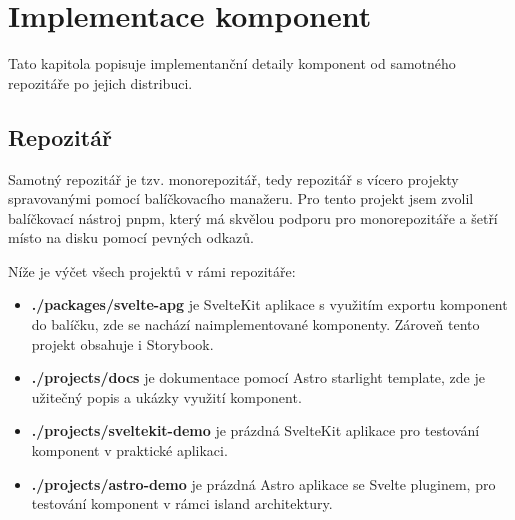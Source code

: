 \chapter{Implementace komponent}

Tato kapitola popisuje implementanční detaily komponent od samotného repozitáře po jejich distribuci.

\section{Repozitář}

Samotný repozitář je tzv. monorepozitář, tedy repozitář s vícero projekty spravovanými pomocí balíčkovacího manažeru.
Pro tento projekt jsem zvolil balíčkovací nástroj pnpm, který má skvělou podporu pro monorepozitáře a šetří místo na disku pomocí pevných odkazů.

Níže je výčet všech projektů v rámi repozitáře:


\begin{itemize}
    \item \textbf{./packages/svelte-apg} je SvelteKit aplikace s využitím exportu komponent do balíčku, zde se nachází naimplementované komponenty. Zároveň tento projekt obsahuje i Storybook.
    \item \textbf{./projects/docs} je dokumentace pomocí Astro starlight template, zde je užitečný popis a ukázky využití komponent.
    \item \textbf{./projects/sveltekit-demo} je prázdná SvelteKit aplikace pro testování komponent v praktické aplikaci.
    \item \textbf{./projects/astro-demo} je prázdná Astro aplikace se Svelte pluginem, pro testování komponent v rámci island architektury.
\end{itemize}
